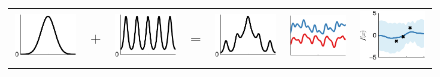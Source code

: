 \begin{figure}
\begin{tabular}{ccccc|c|c}
   \includegraphics[width=\fw]{../figures/structure_examples/se_kernel} & $+$ & \includegraphics[width=\fw]{../figures/structure_examples/per_kernel} & = & \includegraphics[width=\fw]{../figures/structure_examples/se_plus_per} & \includegraphics[width=\fw]{../figures/structure_examples/se_plus_per_draws} & \includegraphics[width=\fw]{../figures/structure_examples/se_plus_per_post} \\

\end{tabular}
\end{figure}

